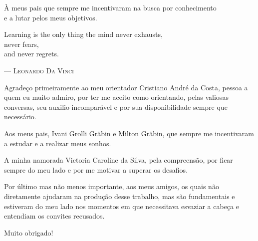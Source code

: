 \documentclass[english,brazilian]{UNISINOSmonografia}
\begin{document}
\capa
\folhaderosto

\begin{dedicatoria}
À meus pais que sempre me incentivaram na busca por conhecimento \\e a lutar pelos meus objetivos.\\[4ex] %

\begin{itshape} %
Learning is the only thing the mind never exhausts, \\
never fears, \\
and never regrets.\\
\end{itshape}
--- \textsc{Leonardo Da Vinci} %
\end{dedicatoria}

\begin{agradecimentos}
Agradeço primeiramente ao meu orientador Cristiano André da Costa, pessoa a quem eu muito admiro, por ter me aceito como orientando, pelas valiosas conversas, seu auxilio incomparável e por sua disponibilidade sempre que necessário.

Aos meus pais, Ivani Grolli Gräbin e Milton Gräbin, que sempre me incentivaram a estudar e a realizar meus sonhos.

A minha namorada Victoria Caroline da Silva, pela compreensão, por ficar sempre do meu lado e por me motivar a superar os desafios.

Por último mas não menos importante, aos meus amigos, os quais não diretamente ajudaram na produção desse trabalho, mas são fundamentais e estiveram do meu lado nos momentos em que necessitava esvaziar a cabeça e entendiam os convites recusados.

Muito obrigado!
\end{agradecimentos}

%
\end{document}
